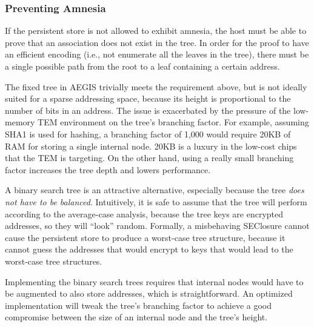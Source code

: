 \subsubsection{Preventing Amnesia}
If the persistent store is not allowed to exhibit amnesia, the host must be
able to prove that an association does not exist in the tree. In order for the
proof to have an efficient encoding (i.e., not enumerate all the leaves in the
tree), there must be a single possible path from the root to a leaf containing
a certain address.

The fixed tree in AEGIS \cite{suh2003aat} trivially meets the requirement
above, but is not ideally suited for a sparse addressing space, because its
height is proportional to the number of bits in an address. The issue is
exacerbated by the pressure of the low-memory TEM environment on the
tree's branching factor. For example, assuming SHA1 is used for
hashing, a branching factor of 1,000 would require 20KB of RAM for storing a
single internal node. 20KB is a luxury in the low-cost chips that the TEM is
targeting. On the other hand, using a really small branching factor increases
the tree depth and lowers performance.

A binary search tree is an attractive alternative, especially because the tree
\emph{does not have to be balanced}. Intuitively, it is safe to assume that the
tree will perform according to the average-case analysis, because the tree keys
are encrypted addresses, so they will ``look'' random. Formally, a misbehaving
SEClosure cannot cause the persistent store to produce a worst-case tree structure, because it cannot guess the addresses that would encrypt to keys that would lead to the worst-case tree structures.

Implementing the binary search trees requires that internal nodes would have to
be augmented to also store addresses, which is straightforward. An optimized
implementation will tweak the tree's branching factor to achieve a good
compromise between the size of an internal node and the tree's height.
